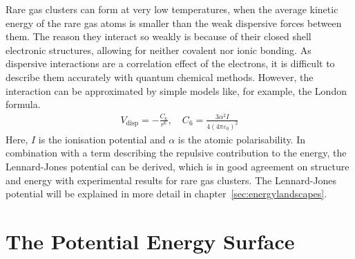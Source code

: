 Rare gas clusters can form at very low temperatures, when the average kinetic
energy of the rare gas atoms is smaller than the weak dispersive forces between
them. The reason they interact so weakly is because of their closed shell
electronic structures, allowing for neither covalent nor ionic bonding. As
dispersive interactions are a correlation effect of the electrons, it is
difficult to describe them accurately with quantum chemical methods. However,
the interaction can be approximated by simple models like, for example, the
London formula.
%
\begin{align}
    V_\text{disp}=-\frac{C_6}{r^6},\quad C_6=\frac{3\alpha^2I}{4\left(4\pi\varepsilon_0\right)^2}
\end{align}
%
Here, $I$ is the ionisation potential and $\alpha$ is the atomic polarisability.
In combination with a term describing the repulsive contribution to the energy,
the Lennard-Jones potential can be derived, which is in good agreement on
structure and energy with experimental results for rare gas clusters. The
Lennard-Jones potential will be explained in more detail in
chapter~\ref{sec:energylandscapes}.

\section{The Potential Energy Surface}
\label{sec:ThePotentialEnergySurface}

